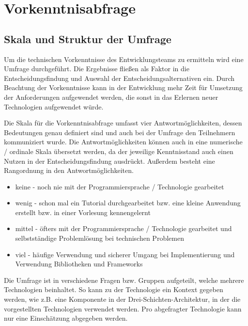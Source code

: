 \section{Vorkenntnisabfrage}
\label{sec:Vorkenntnisabfrage}
\subsection{Skala und Struktur der Umfrage}
Um die technischen Vorkenntnisse des Entwicklungsteams zu ermitteln wird eine Umfrage durchgeführt.
Die Ergebnisse fließen als Faktor in die Entscheidungsfindung und Auswahl der Entscheidungsalternativen ein.
Durch Beachtung der Vorkenntnisse kann in der Entwicklung mehr Zeit für Umsetzung der Anforderungen aufgewendet werden, die sonst in das Erlernen neuer Technologien aufgewendet würde.

Die Skala für die Vorkenntnisabfrage umfasst vier Antwortmöglichkeiten, dessen Bedeutungen genau definiert sind und auch bei der Umfrage den Teilnehmern kommuniziert wurde.
Die Antwortmöglichkeiten können auch in eine numerische / ordinale Skala übersetzt werden, da der jeweilige Kenntnisstand auch einen Nutzen in der Entscheidungsfindung ausdrückt.
Außerdem besteht eine Rangordnung in den Antwortmöglichkeiten.

\begin{itemize}
	\item keine - noch nie mit der Programmiersprache / Technologie gearbeitet
	\item wenig - schon mal ein Tutorial durchgearbeitet bzw. eine kleine Anwendung erstellt bzw. in einer Vorlesung kennengelernt
	\item mittel - öfters mit der Programmiersprache / Technologie gearbeitet und selbstständige Problemlösung bei technischen Problemen
	\item viel - häufige Verwendung und sicherer Umgang bei Implementierung und Verwendung Bibliotheken und Frameworks
\end{itemize}

Die Umfrage ist in verschiedene Fragen bzw. Gruppen aufgeteilt, welche mehrere Technologien beinhaltet.
So kann zu der Technologie ein Kontext gegeben werden, wie z.B. eine Komponente in der Drei-Schichten-Architektur, in der die vorgestellten Technologien verwendet werden.
Pro abgefragter Technologie kann nur eine Einschätzung abgegeben werden.

